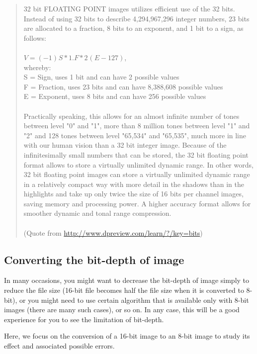 \begin{quotation}
32 bit FLOATING POINT images utilizes efficient use of the 32 bits.
Instead of using 32 bits to describe 4,294,967,296 integer numbers, 23
bits are allocated to a fraction, 8 bits to an exponent, and 1 bit to a
sign, as follows:\\
~\\
$V = (-1)^{}S * 1.F * 2^{}(E-127)$,\\ 
whereby:\\
S = Sign, uses 1 bit and can have 2 possible values\\
F = Fraction, uses 23 bits and can have 8,388,608 possible
values\\
E = Exponent, uses 8 bits and can have 256 possible values\\
~\\
Practically speaking, this allows for an almost infinite number of tones
between level "0" and
"1", more than 8 million tones between
level "1" and
"2" and 128 tones between level
"65,534" and
"65,535", much more in line with our human
vision than a 32 bit integer image. Because of the infinitesimally
small numbers that can be stored, the 32 bit floating point format
allows to store a virtually unlimited dynamic range. In other words, 32
bit floating point images can store a virtually unlimited dynamic range
in a relatively compact way with more detail in the shadows than in the
highlights and take up only twice the size of 16 bits per channel
images, saving memory and processing power. A higher accuracy format
allows for smoother dynamic and tonal range compression.\\
\\
(Quote from \url{http://www.dpreview.com/learn/?/key=bits})
\end{quotation}




\subsection{Converting the bit-depth of image}

In many occasions, you might want to decrease the bit-depth of image
simply to reduce the file size (16-bit file becomes half the file size
when it is converted to 8-bit), or you might need to use certain
algorithm that is available only with 8-bit images (there are many such
cases), or so on. In any case, this will be a good experience for you
to see the limitation of bit-depth.

Here, we focus on the conversion of a 16-bit image to an 8-bit image to
study its effect and associated possible errors. 



